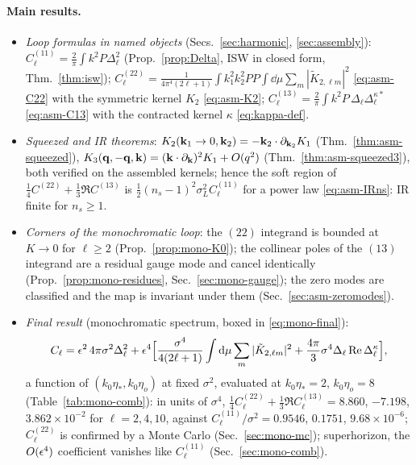 \paragraph{Main results.}
\begin{itemize}\itemsep1pt
\item[(1)] \emph{Loop formulas in named objects} (Secs.~\ref{sec:harmonic}, \ref{sec:assembly}):
$C^{(11)}_\ell=\frac2\pi\int k^2P\Delta_\ell^2$ (Prop.~\ref{prop:Delta}, ISW in closed form, Thm.~\ref{thm:isw});
$C^{(22)}_\ell=\frac1{4\pi^4(2\ell+1)}\int k_1^2k_2^2PP\int\dd\mu\sum_m|\tilde K_{2,\ell m}|^2$ \eqref{eq:asm-C22} with the symmetric kernel $K_2$ \eqref{eq:asm-K2};
$C^{(13)}_\ell=\frac2\pi\int k^2P\,\Delta_\ell\Delta^{\kappa*}_\ell$ \eqref{eq:asm-C13} with the contracted kernel $\kappa$ \eqref{eq:kappa-def}.
\item[(2)] \emph{Squeezed and IR theorems}: $K_2(\mathbf k_1\to0,\mathbf k_2)=-\mathbf k_2\cdot\partial_{\mathbf k_2}K_1$ (Thm.~\ref{thm:asm-squeezed}), $K_3(\mathbf q,-\mathbf q,\mathbf k)=(\mathbf k\cdot\partial_\mathbf k)^2K_1+O(q^2)$
(Thm.~\ref{thm:asm-squeezed3}), both verified on the assembled kernels; hence the soft region of $\tfrac14C^{(22)}+\tfrac13\Re C^{(13)}$ is
$\tfrac12(n_s-1)^2\sigma_L^2C^{(11)}_\ell$ for a power law \eqref{eq:asm-IRns}: IR finite for $n_s\ge1$.
\item[(3)] \emph{Corners of the monochromatic loop}: the $(22)$ integrand is bounded at $K\to0$ for $\ell\ge2$ (Prop.~\ref{prop:mono-K0}); the collinear
poles of the $(13)$ integrand are a residual gauge mode and cancel identically (Prop.~\ref{prop:mono-residues}, Sec.~\ref{sec:mono-gauge}); the zero modes
are classified and the map is invariant under them (Sec.~\ref{sec:asm-zeromodes}).
\item[(4)] \emph{Final result} (monochromatic spectrum, boxed in \eqref{eq:mono-final}):
\[C_\ell=\epsilon^2\,4\pi\sigma^2\Delta_\ell^2+\epsilon^4\Big[\frac{\sigma^4}{4(2\ell+1)}\int\mathrm d\mu\sum_m|\tilde K_{2,\ell m}|^2+\frac{4\pi}3\sigma^4\Delta_\ell\operatorname{Re}\Delta^\kappa_\ell\Big],\]
a function of $(k_0\eta_*,k_0\eta_o)$ at fixed $\sigma^2$, evaluated at $k_0\eta_*=2$, $k_0\eta_o=8$ (Table~\ref{tab:mono-comb}): in units of $\sigma^4$,
$\tfrac14C^{(22)}_\ell+\tfrac13\Re C^{(13)}_\ell=8.860$, $-7.198$, $3.862\times10^{-2}$ for $\ell=2,4,10$, against $C^{(11)}_\ell/\sigma^2=0.9546$, $0.1751$,
$9.68\times10^{-6}$; $C^{(22)}_\ell$ is confirmed by a Monte Carlo (Sec.~\ref{sec:mono-mc}); superhorizon, the $O(\epsilon^4)$ coefficient vanishes like
$C^{(11)}_\ell$ (Sec.~\ref{sec:mono-comb}).
\end{itemize}

